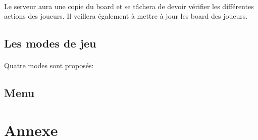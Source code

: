 \documentclass[10pt, a4paper]{article}
\begin{document}
		\paragraph{}Le serveur aura une copie du board et se tâchera de devoir vérifier les différentes actions des joueurs. Il veillera également à  mettre à jour les board des joueurs.
		\subsection{Les modes de jeu}
		\paragraph{}Quatre modes sont proposés:
		
		\subsection{Menu}
		
	\section{Annexe}
	
	
		
		
		
		
\end{document}
